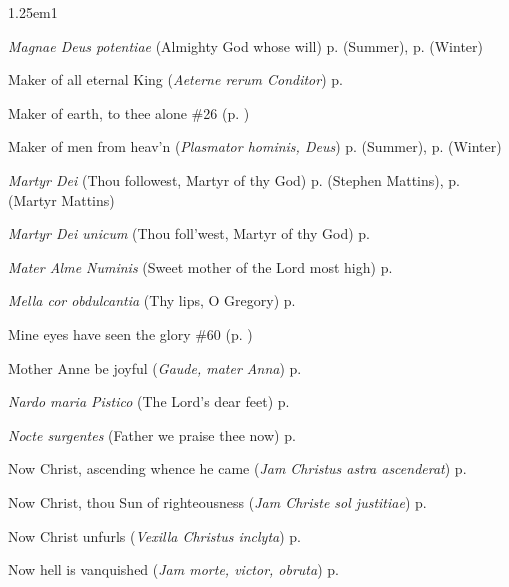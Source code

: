 \begin{hangparas}{1.25em}{1}
\par\noindent
\textit{Magnae Deus potentiae} (Almighty God whose will) \dotfill p. \pageref{ThursdayEvensongSummer} (Summer), p. \pageref{ThursdayEvensongWinter} (Winter)
\par\noindent
Maker of all eternal King (\textit{Aeterne rerum Conditor}) \dotfill p. \pageref{SundayMattinsWinter}
\par\noindent
Maker of earth, to thee alone \dotfill \#26 (p. \pageref{Hymn26})
\par\noindent
Maker of men from heav'n (\textit{Plasmator hominis, Deus}) \dotfill p. \pageref{FridayEvensongSummer} (Summer), p. \pageref{FridayEvensongWinter} (Winter)
\par\noindent
\textit{Martyr Dei} (Thou followest, Martyr of thy God) \dotfill p. \pageref{StephenMattins} (Stephen Mattins), p. \pageref{MartyrMattins} (Martyr Mattins)
\par\noindent
\textit{Martyr Dei unicum} (Thou foll'west, Martyr of thy God) \dotfill p. \pageref{MartyrMattinsEaster}
\par\noindent
\textit{Mater Alme Numinis} (Sweet mother of the Lord most high) \dotfill p. \pageref{MotherhoodMattins}
\par\noindent
\textit{Mella cor obdulcantia} (Thy lips, O Gregory) \dotfill p. \pageref{GregoryMattins}
\par\noindent
Mine eyes have seen the glory \dotfill \#60 (p. \pageref{Hymn60})
\par\noindent
Mother Anne be joyful (\textit{Gaude, mater Anna}) \dotfill p. \pageref{AnneIEvensong}
\par\noindent
\textit{Nardo maria Pistico} (The Lord's dear feet) \dotfill p. \pageref{MaryMagdaleneInvitatory}
\par\noindent
\textit{Nocte surgentes} (Father we praise thee now) \dotfill p. \pageref{SundayInvitatorySummer}
\par\noindent
Now Christ, ascending whence he came (\textit{Jam Christus astra ascenderat}) \dotfill p. \pageref{WhitsundayInvitatoryHymn}
\par\noindent
Now Christ, thou Sun of righteousness (\textit{Jam Christe sol justitiae}) \dotfill p. \pageref{FirstLentMattinsHymn}
\par\noindent
Now Christ unfurls (\textit{Vexilla Christus inclyta}) \dotfill p. \pageref{ChristTheKingMattins}
\par\noindent
Now hell is vanquished (\textit{Jam morte, victor, obruta}) \dotfill p. \pageref{HolyRosaryMattins}
\par\noindent

\end{hangparas}
